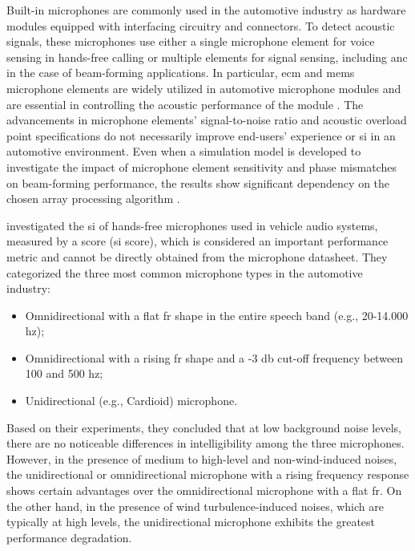 Built-in microphones are commonly used in the automotive industry as hardware modules equipped with interfacing circuitry and connectors. To detect acoustic signals, these microphones use either a single microphone element for voice sensing in hands-free calling or multiple elements for signal sensing, including \gls{anc} in the case of beam-forming applications. In particular, \gls{ecm} and \gls{mems} microphone elements are widely utilized in automotive microphone modules and are essential in controlling the acoustic performance of the module \cite{Aubauer2001}. The advancements in microphone elements' signal-to-noise ratio and acoustic overload point specifications do not necessarily improve end-users' experience or \gls{si} in an automotive environment. Even when a simulation model is developed to investigate the impact of microphone element sensitivity and phase mismatches on beam-forming performance, the results show significant dependency on the chosen array processing algorithm \cite{Du2019}. 

\textcite{Du2022} investigated the \gls{si} of hands-free microphones used in vehicle audio systems, measured by a score (\gls{si} score), which is considered an important performance metric and cannot be directly obtained from the microphone datasheet. They categorized the three most common microphone types in the automotive industry:

\begin{itemize}
    \item Omnidirectional with a flat \gls{fr} shape in the entire speech band (e.g., 20-14.000 \gls{hz});
    \item Omnidirectional with a rising \gls{fr} shape and a -3 \gls{db} cut-off frequency between 100 and 500 \gls{hz};
    \item Unidirectional (e.g., Cardioid) microphone.   
\end{itemize}

Based on their experiments, they concluded that at low background noise levels, there are no noticeable differences in intelligibility among the three microphones. However, in the presence of medium to high-level and non-wind-induced noises, the unidirectional or omnidirectional microphone with a rising frequency response shows certain advantages over the omnidirectional microphone with a flat \gls{fr}. On the other hand, in the presence of wind turbulence-induced noises, which are typically at high levels, the unidirectional microphone exhibits the greatest performance degradation.


